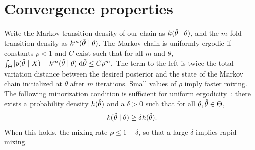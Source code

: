 
\section{Convergence properties}

Write the Markov transition density of our chain as $k(\hat{\theta}\mid\theta)$, and the $m$-fold transition density as $k^m(\hat{\theta}\mid\theta)$.
The Markov chain is uniformly
ergodic if constants $\rho < 1$ and $C$ exist such that for all $m$ and $\theta$,
$
 \int_{\Theta} | p(\hat{\theta}\mid X) - k^m(\hat{\theta}\mid\theta)| \mathrm{d}\hat{\theta} \le C \rho^m. \nonumber
 $
The term to the left is twice the total variation distance between the desired posterior and the state of the Markov chain initialized at $\theta$ after $m$ iterations. 
Small values of $\rho$ imply faster mixing.
The following minorization condition is sufficient for uniform ergodicity~\citep{jones2001}: there exists a probability density $h(\hat{\theta})$ and a $\delta > 0$ such that
for all $\theta,\hat{\theta} \in \Theta$, 
\begin{align}
 k(\htheta\mid\theta) \ge \delta h(\htheta). \label{eq:unif_erg}
\end{align}
When this holds, the mixing rate $\rho \le 1-\delta$, so that a large $\delta$ implies rapid mixing.


